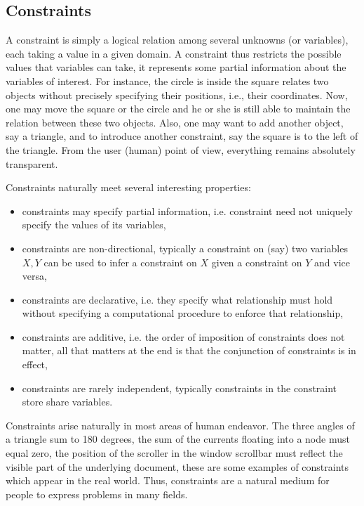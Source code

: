 \subsection{Constraints}\label{introduction:constraints}\hypertarget{introduction:constraints}{}
A constraint is simply a logical relation among several unknowns (or variables), each taking a value in a given domain. A constraint thus restricts the possible values that variables can take, it represents some partial information about the variables of interest. For instance, the circle is inside the square relates two objects without precisely specifying their positions, i.e., their coordinates. Now, one may move the square or the circle and he or she is still able to maintain the relation between these two objects. Also, one may want to add another object, say a triangle, and to introduce another constraint, say the square is to the left of the triangle. From the user (human) point of view, everything remains absolutely transparent.

Constraints naturally meet several interesting properties:
\begin{itemize}
	\item constraints may specify partial information, i.e. constraint need not uniquely specify the values of its variables,
	\item constraints are non-directional, typically a constraint on (say) two variables $X, Y$ can be used to infer a constraint on $X$ given a constraint on $Y$ and vice versa,
	\item constraints are declarative, i.e. they specify what relationship must hold without specifying a computational procedure to enforce that relationship,
	\item constraints are additive, i.e. the order of imposition of constraints does not matter, all that matters at the end is that the conjunction of constraints is in effect,
	\item constraints are rarely independent, typically constraints in the constraint store share variables.
\end{itemize}

Constraints arise naturally in most areas of human endeavor. The three angles of a triangle sum to 180 degrees, the sum of the currents floating into a node must equal zero, the position of the scroller in the window scrollbar must reflect the visible part of the underlying document, these are some examples of constraints which appear in the real world. Thus, constraints are a natural medium for people to express problems in many fields. 


